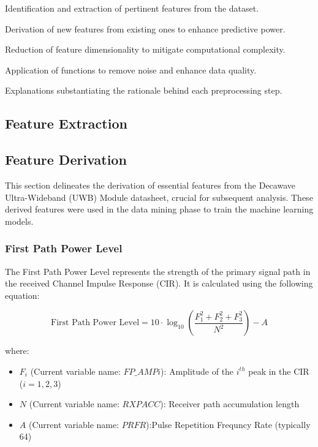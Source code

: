 \documentclass[
	article, %
	11pt, %
	draft, %
]{CSUniSchoolLabReport}
\begin{document}
\begin{description}[style=nextline]
    \item[Feature Extraction:] Identification and extraction of pertinent features from the dataset.
    \item[Feature Derivation:] Derivation of new features from existing ones to enhance predictive power.
    \item[Feature Reduction:] Reduction of feature dimensionality to mitigate computational complexity.
    \item[De-Noise Functions:] Application of functions to remove noise and enhance data quality.
    \item[Justifications of Processes:] Explanations substantiating the rationale behind each preprocessing step.
\end{description}

\subsection{Feature Extraction}\label{feature_extraction}


\subsection{Feature Derivation}\label{feature_derivation}

This section delineates the derivation of essential features from the Decawave Ultra-Wideband (UWB) Module datasheet, crucial for subsequent analysis. These derived features were used in the data mining phase to train the machine learning models.

\subsubsection{First Path Power Level}\label{first_path_power_level}

The First Path Power Level represents the strength of the primary signal path in the received Channel Impulse Response (CIR). It is calculated using the following equation:

\begin{equation}
  \text{First Path Power Level} = 10 \cdot \log_{10} \left( \frac{F_1^2 + F_2^2 + F_3^2}{N^2} \right) - A
\end{equation}

where:

\begin{itemize}
  \item $F_i$ (Current variable name: $FP\_AMPi$): Amplitude of the $i^{th}$ peak in the CIR ($i = 1, 2, 3$)
  \item $N$ (Current variable name: $RXPACC$): Receiver path accumulation length
  \item $A$ (Current variable name: $PRFR$):Pulse Repetition Frequncy Rate (typically 64)
\end{itemize}
\end{document}
